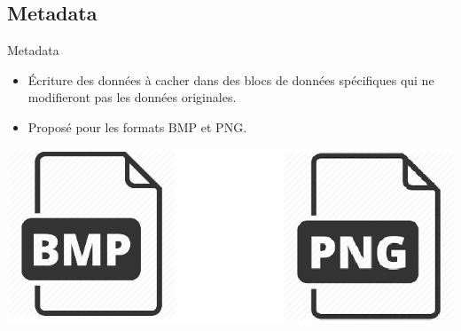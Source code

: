 \documentclass{beamer}
\begin{document}
	\subsection{Metadata}
    \begin{frame}
    
	\begin{block}{Metadata}
	\begin{itemize}
	[circle]
	\item Écriture des données à cacher dans des blocs de données spécifiques 
	qui ne modifieront pas les données originales. 
	\item Proposé pour les formats BMP et PNG. 
	\end{itemize}
	\end{block}
	
	\hspace{3.5cm}
    \includegraphics[scale=0.2]{pictures/meta.png}
    
    \end{frame}
    
\end{document}
